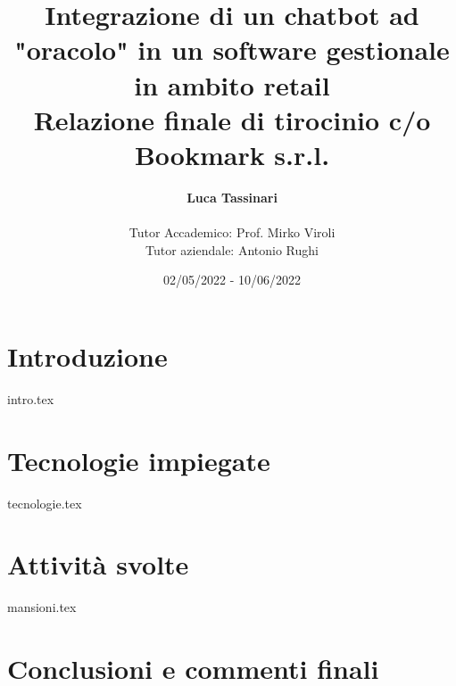 \documentclass[a4paper,twoside,11pt]{report}
\title{
	Integrazione di un chatbot ad "oracolo" in un software gestionale in ambito  retail \\
	\large Relazione finale di tirocinio c/o Bookmark s.r.l.
}
\author{
	\textbf{Luca Tassinari} \\\\
	Tutor Accademico: Prof. Mirko Viroli \\
	Tutor aziendale: Antonio Rughi
}
\date{02/05/2022 - 10/06/2022}
\begin{document}
\maketitle

\tableofcontents

\chapter[Introduzione]{Introduzione}
{intro.tex}

\chapter[Tecnologie]{Tecnologie impiegate}
{tecnologie.tex}

\chapter[Attività]{Attività svolte}
{mansioni.tex}

\chapter[Conclusioni]{Conclusioni e commenti finali}



\end{document}
